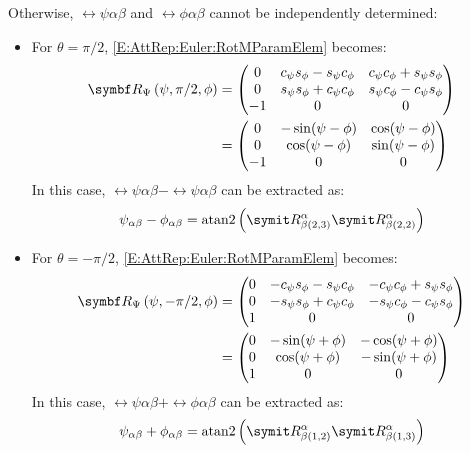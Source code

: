 Otherwise, $\rel{\psi}{\alpha}{\beta}$ and $\rel{\phi}{\alpha}{\beta}$ cannot be independently determined:
 \begin{itemize}
	
	\item For $\theta = \pi/2$, \eqref{E:AttRep:Euler:RotMParamElem} becomes:
	\begin{equation*}
		\begin{split}
			\RotMEuler{\psi}{\pi/2}{\phi}
			&=
			\begin{pmatrix}
				0	&	c_{\psi} s_{\phi} - s_{\psi} c_{\phi}	&	c_{\psi} c_{\phi} + s_{\psi} s_{\phi}\\
				0	&	s_{\psi} s_{\phi} + c_{\psi} c_{\phi}	&	s_{\psi} c_{\phi} - c_{\psi} s_{\phi}\\
				-1	&	0										&	0	
			\end{pmatrix}\\
			&=	
			\begin{pmatrix}
				0	&	-\sin(\psi - \phi) 	&	\cos(\psi - \phi)  \\
				0	&	\cos(\psi - \phi) 	&	\sin(\psi - \phi) \\
				-1	&	0					&	0	
			\end{pmatrix}
		\end{split}
	\end{equation*}
	In this case, $\rel{\psi}{\alpha}{\beta} - \rel{\psi}{\alpha}{\beta}$ can be extracted as:
	\begin{equation*}
		\rel{\psi}{\alpha}{\beta} - \rel{\phi}{\alpha}{\beta} = \atan2 \left( \cRotM{\alpha}{\beta}{2,3}\cRotM{\alpha}{\beta}{2,2}  \right)
	\end{equation*}

	\item For $\theta = -\pi/2$, \eqref{E:AttRep:Euler:RotMParamElem} becomes:
	\begin{equation*}
		\begin{split}
			\RotMEuler{\psi}{-\pi/2}{\phi}
			&=
			\begin{pmatrix}
				0	&	- c_{\psi} s_{\phi} - s_{\psi} c_{\phi}	&	- c_{\psi} c_{\phi} + s_{\psi} s_{\phi}\\
				0	&	- s_{\psi} s_{\phi} + c_{\psi} c_{\phi}	&	- s_{\psi} c_{\phi} - c_{\psi} s_{\phi}\\
				1	&	0										&	0	
			\end{pmatrix}\\
			&=	
			\begin{pmatrix}
				0	&	-\sin(\psi + \phi) 	&	-\cos(\psi + \phi) \\
				0	&	\cos(\psi + \phi) 	&	-\sin(\psi + \phi) \\
				1	&	0					&	0	
			\end{pmatrix}
		\end{split}
	\end{equation*}
	In this case, $\rel{\psi}{\alpha}{\beta} + \rel{\phi}{\alpha}{\beta}$ can be extracted as:
	\begin{equation*}
		\rel{\psi}{\alpha}{\beta} + \rel{\phi}{\alpha}{\beta} = \atan2 \left( \cRotM{\alpha}{\beta}{1,2}\cRotM{\alpha}{\beta}{1,3}  \right)
	\end{equation*}
 \end{itemize}

